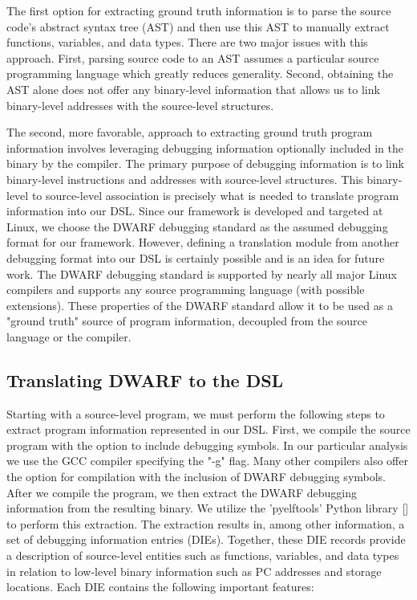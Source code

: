 The first option for extracting ground truth information is to parse the source code's abstract syntax tree (AST) and then use this AST to manually extract functions, variables, and data types. There are two major issues with this approach. First, parsing source code to an AST assumes a particular source programming language which greatly reduces generality. Second, obtaining the AST alone does not offer any binary-level information that allows us to link binary-level addresses with the source-level structures.

The second, more favorable, approach to extracting ground truth program information involves leveraging debugging information optionally included in the binary by the compiler. The primary purpose of debugging information is to link binary-level instructions and addresses with source-level structures. This binary-level to source-level association is precisely what is needed to translate program information into our DSL. Since our framework is developed and targeted at Linux, we choose the DWARF debugging standard as the assumed debugging format for our framework. However, defining a translation module from another debugging format into our DSL is certainly possible and is an idea for future work. The DWARF debugging standard is supported by nearly all major Linux compilers and supports any source programming language (with possible extensions). These properties of the DWARF standard allow it to be used as a "ground truth" source of program information, decoupled from the source language or the compiler.

\subsection{Translating DWARF to the DSL}

Starting with a source-level program, we must perform the following steps to extract program information represented in our DSL. First, we compile the source program with the option to include debugging symbols. In our particular analysis we use the GCC compiler specifying the "-g" flag. Many other compilers also offer the option for compilation with the inclusion of DWARF debugging symbols. After we compile the program, we then extract the DWARF debugging information from the resulting binary. We utilize the 'pyelftools' Python library [] to perform this extraction. The extraction results in, among other information, a set of debugging information entries (DIEs). Together, these DIE records provide a description of source-level entities such as functions, variables, and data types in relation to low-level binary information such as PC addresses and storage locations. Each DIE contains the following important features:

